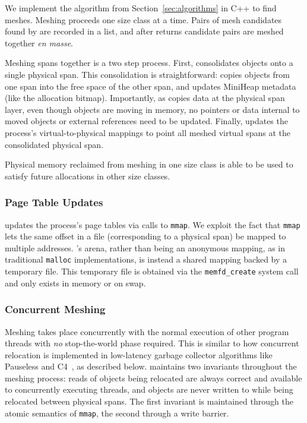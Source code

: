 We implement the \sm algorithm from Section~\ref{sec:algorithms} in
C++ to find meshes.  Meshing proceeds one size class at a time.  Pairs
of mesh candidates found by \sm are recorded in a list, and after \sm
returns candidate pairs are meshed together \emph{en masse}.

Meshing spans together is a two step process. First, \Mesh{}
consolidates objects onto a single physical span. This consolidation
is straightforward: \Mesh{} copies objects from one span into the free
space of the other span, and updates MiniHeap metadata (like the
allocation bitmap).  Importantly, as \Mesh copies data at the physical
span layer, even though objects are moving in memory, no pointers or
data internal to moved objects or external references need to be
updated. Finally, \Mesh{} updates the process's virtual-to-physical mappings
to point all meshed virtual spans at the consolidated physical
span.

Physical memory reclaimed from meshing in one size class is able to be
used to satisfy future allocations in other size classes.

\subsubsection{Page Table Updates}
\label{sec:page-table-updates}

\Mesh updates the process's page tables via calls to \texttt{mmap}.
We exploit the fact that \texttt{mmap} lets the same offset in a file
(corresponding to a physical span) be mapped to multiple
addresses. \Mesh's arena, rather than being an anonymous mapping, as
in traditional \texttt{malloc} implementations, is instead a shared mapping
backed by a temporary file. This temporary file is obtained via the
\texttt{memfd\_create} system call and only exists in memory or on
swap.


\subsubsection{Concurrent Meshing}

Meshing takes place concurrently with the normal execution of other
program threads with \textit{no} stop-the-world phase required.  This
is similar to how concurrent relocation is implemented in low-latency
garbage collector algorithms like Pauseless and
C4~\cite{click:2005:pauseless, tene:2011:c4}, as described below.
\Mesh maintains two invariants throughout the meshing process: reads
of objects being relocated are always correct and available to
concurrently executing threads, and objects are never written to while
being relocated between physical spans.  The first invariant is maintained
through the atomic semantics of \texttt{mmap}, the second through a
write barrier.

